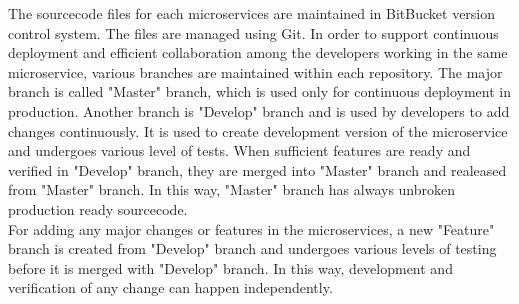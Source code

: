 The sourcecode files for each microservices are maintained in BitBucket version control system. The files are managed using Git. In order to support continuous deployment and efficient collaboration among the developers working in the same microservice, various branches are maintained within each repository. The major branch is called "Master" branch, which is used only for continuous deployment in production. Another branch is "Develop" branch and is used by developers to add changes continuously. It is used to create development version of the microservice and undergoes various level of tests. When sufficient features are ready and verified in "Develop" branch, they are merged into "Master" branch and realeased from "Master" branch. In this way, "Master" branch has always unbroken production ready sourcecode.
\\
For adding any major changes or features in the microservices, a new "Feature" branch is created from "Develop" branch and undergoes various levels of testing before it is merged with "Develop" branch. In this way, development and verification of any change can happen independently.

